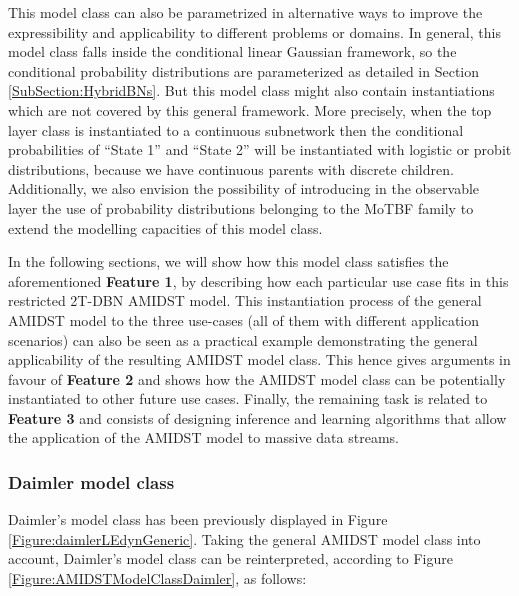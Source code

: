 This model class can also be parametrized in alternative ways to improve the expressibility and applicability to different problems or domains. In general, this model class falls inside the conditional linear Gaussian framework, so the conditional probability distributions are parameterized as detailed in Section \ref{SubSection:HybridBNs}. But this model class might also contain instantiations which are not covered by this general framework. More precisely, when the top layer class is instantiated to  a continuous subnetwork then the conditional probabilities of ``State 1'' and ``State 2'' will be instantiated with logistic or probit distributions, because we have continuous parents with discrete children. Additionally, we also envision the possibility of introducing in the observable layer the use of probability distributions belonging to the MoTBF family \cite{Langseth12} to extend the modelling capacities of this model class.

In the following sections, we will show how this model class satisfies the aforementioned \textbf{Feature 1}, by describing how each particular use case fits in this restricted 2T-DBN AMIDST model. This instantiation process of the general AMIDST model to the three use-cases (all of them with different application scenarios) can also be seen as a practical example demonstrating the general applicability of the resulting AMIDST model class. This hence gives arguments in favour of \textbf{Feature 2} and shows how the AMIDST model class can be potentially instantiated to other future use cases. Finally, the remaining task is related to \textbf{Feature 3} and consists of designing inference and learning algorithms that allow the application of the AMIDST model to massive data streams. 



\subsubsection{Daimler model class}\label{daimlerAMIDSTModels}


Daimler's model class has been previously displayed in Figure \ref{Figure:daimlerLEdynGeneric}. Taking the general AMIDST model class into account, Daimler's model class can be reinterpreted, according to Figure \ref{Figure:AMIDSTModelClassDaimler}, as follows:

